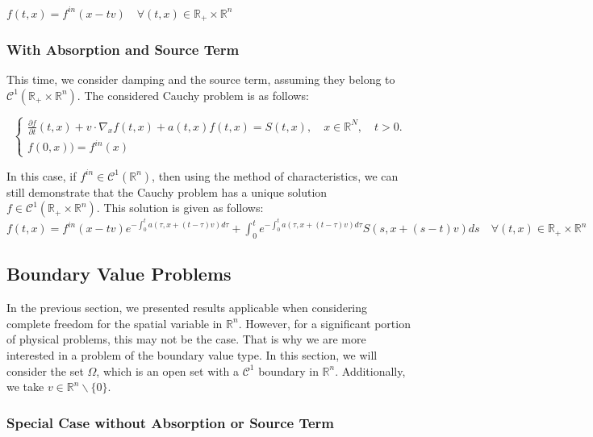 \documentclass[onecolumn, 12pt, a4paper]{article}
\begin{document}
	
	
	
	
	$\boxed{f(t,x)=f^{in}(x-tv) \quad \forall (t,x) \in \mathbb{R}_+ \times \mathbb{R}^n }$
	
	
	
	
	\subsubsection{With Absorption and Source Term}
	
	This time, we consider damping and the source term, assuming they belong to $\mathcal{C}^1(\mathbb{R}_+ \times \mathbb{R}^n)$. The considered Cauchy problem is as follows:
	
	
	\[
	\begin{cases}
		\frac{\partial f}{\partial t}(t,x)+v \cdot \nabla_x f(t,x) + a(t,x)f(t,x) = S(t,x), \quad x \in \mathbb{R}^N, \quad t>0.\\
		f(0,x)) = f^{in}(x)
	\end{cases}
	\]
	
	In this case, if $f^{in} \in \mathcal{C}^1(\mathbb{R}^n)$, then using the method of characteristics, we can still demonstrate that the Cauchy problem has a unique solution $f \in \mathcal{C}^1(\mathbb{R}_+ \times \mathbb{R}^n)$. This solution is given as follows:\\
	$\boxed{f(t,x)=f^{in}(x-tv) e^{-\int_0 ^t a(\tau,x+(t-\tau)v)d\tau} + \int_0 ^t  e^{-\int_0 ^t a(\tau,x+(t-\tau)v)d\tau} S(s,x+(s-t)v)ds \quad \forall (t,x) \in \mathbb{R}_+ \times \mathbb{R}^n }$
	
	\subsection{Boundary Value Problems}
	
	In the previous section, we presented results applicable when considering complete freedom for the spatial variable in $\mathbb{R}^n$. However, for a significant portion of physical problems, this may not be the case. That is why we are more interested in a problem of the boundary value type. In this section, we will consider the set $\Omega$, which is an open set with a $\mathcal{C}^1$ boundary in $\mathbb{R}^n$. Additionally, we take $v \in \mathbb{R}^n\backslash \{0\}$.
	
	\subsubsection{Special Case without Absorption or Source Term}
	
\end{document}
